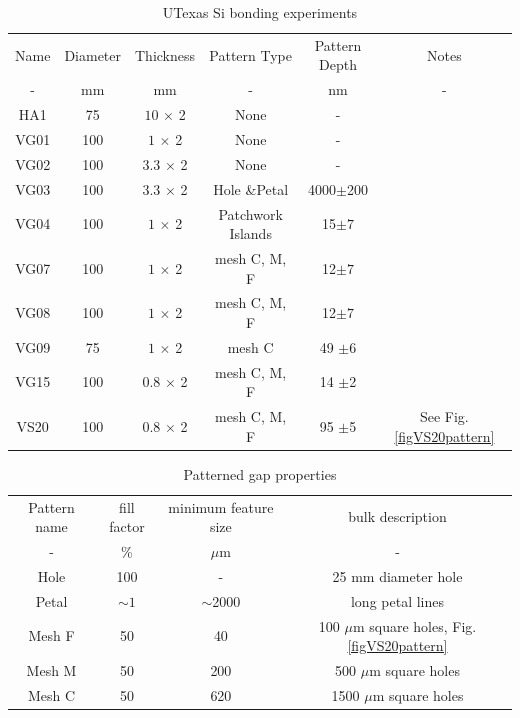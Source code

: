 \documentclass[osajnl,preprint,showpacs,superscriptaddress,12pt]{revtex4-1} %
\begin{document}
\begin{table}[h!]
\caption{UTexas Si bonding experiments \label{tabbondexper}}
\begin{center}
    \begin{tabular}{ c c c c c c}
    \hline
    Name & Diameter & Thickness & Pattern Type & Pattern Depth & Notes \\ 
    -  & mm & mm & - & nm & - \\ 
        \hline
    HA1     & 75   & $10$ $\times$ 2& None & - & \\
    VG01   & 100 &$1$ $\times$ 2 & None  & - &  \\
    VG02   & 100 & $3.3$ $\times$ 2 &  None  & - &  \\
    VG03   & 100 & $3.3$ $\times$ 2 &  Hole \&Petal & 4000$\pm$200 & \\    
    VG04   & 100 & $1$ $\times$ 2 &  Patchwork Islands & 15$\pm7$ & \\
    VG07   & 100 & $1$ $\times$ 2 &  mesh C, M, F & 12$\pm7$ & \\ %
    VG08   & 100 & $1$ $\times$ 2 &  mesh C, M, F & 12$\pm7$ & \\ 
    VG09   & 75   & $1$ $\times$ 2 & mesh C & 49 $\pm$6 & \\
    VG15   & 100 & $0.8$ $\times$ 2 &  mesh C, M, F  &14 $\pm$2 & \\
    VS20   & 100 & $0.8$ $\times$ 2 &  mesh C, M, F & 95 $\pm$5 & See Fig. \ref{figVS20pattern}\\
    \hline
    \end{tabular}
\end{center}
\end{table}


\begin{table}[h!]
\caption{Patterned gap properties \label{tabPatternFills}}
\begin{center}
    \begin{tabular}{ c c c c }
    \hline
    Pattern name & fill factor & minimum feature size & bulk description \\ 
    - & \% & $\mu$m & - \\ 
    \hline
    Hole & 100 & - & 25 mm diameter hole \\     
    Petal & $\sim1$ & $\sim$2000 & long petal lines \\         
    Mesh F & 50 & 40 &  100 $\mu$m square holes, Fig. \ref{figVS20pattern}\\ 
    Mesh M & 50 & 200 &  500 $\mu$m square holes\\ 
    Mesh C & 50 & 620 &  1500 $\mu$m square holes\\     
        \hline
    \end{tabular}
\end{center}
\end{table}
\end{document}
